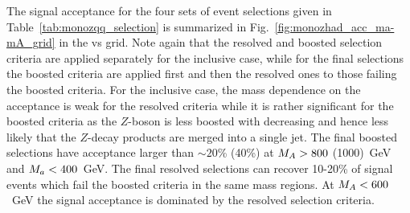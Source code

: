 The signal acceptance for the four sets of event selections given in Table~\ref{tab:monozqq_selection} is 
summarized in Fig.~\ref{fig:monozhad_acc_ma-mA_grid} in the \ma vs \mA grid. Note again that the resolved and boosted 
selection criteria are applied separately for the inclusive case, while for the final selections the boosted criteria are 
applied first and then the resolved ones to those failing the boosted criteria. 
For the inclusive case, the mass dependence on the acceptance is weak for the resolved criteria 
while it is rather significant for the boosted criteria 
as the $Z$-boson is less boosted with decreasing \mA and hence less likely that the $Z$-decay products are merged 
into a single jet. The final boosted selections have acceptance larger than $\sim20$\% (40\%) at 
$M_{A}>800$ (1000)~GeV and $M_{a}<400$~GeV. The final resolved selections can recover 10-20\% of signal 
events which fail the boosted criteria in the same mass regions. At $M_{A}<600$~GeV the signal acceptance 
is dominated by the resolved selection criteria.

